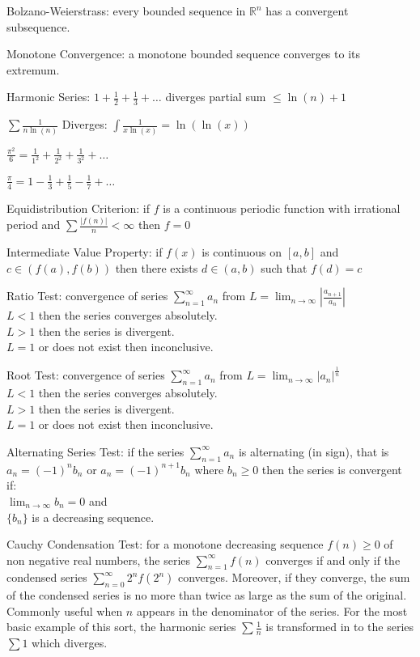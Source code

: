 Bolzano-Weierstrass: every bounded sequence in $\mathbb{R}^n$ has a convergent subsequence.

Monotone Convergence: a monotone bounded sequence converges to its extremum.

Harmonic Series: $1+\frac{1}{2}+\frac{1}{3}+\dots$ diverges partial sum $\le \ln(n)+1$

$\sum \frac{1}{n\ln(n)}$ Diverges: $\int \frac{1}{x\ln(x)} = \ln(\ln(x))$

$\frac{\pi^2}{6} = \frac{1}{1^2} + \frac{1}{2^2} + \frac{1}{3^2} + \dots$

$\frac{\pi}{4}=1-\frac{1}{3} +\frac{1}{5}-\frac{1}{7}+\dots$

Equidistribution Criterion: if $f$ is a continuous periodic function with irrational period and $\sum \frac{|f(n)|}{n} < \infty$ then $f=0$

Intermediate Value Property: if $f(x)$ is continuous on $[a,b]$ and $c \in (f(a),f(b))$ then there exists $d \in (a,b)$ such that $f(d)=c$

Ratio Test: convergence of series $\sum_{n=1}^{\infty} a_n$ from $L = \lim_{n \to \infty} \left|\frac{a_{n+1}}{a_n} \right|$ \\
$L<1$ then the series converges absolutely. \\
$L>1$ then the series is divergent. \\
$L=1$ or does not exist then inconclusive.

Root Test: convergence of series $\sum_{n=1}^{\infty} a_n$ from $L = \lim_{n \to \infty} |a_n|^{\frac{1}{n}}$ \\
$L<1$ then the series converges absolutely. \\
$L>1$ then the series is divergent. \\
$L=1$ or does not exist then inconclusive.

Alternating Series Test: if the series $\sum_{n=1}^{\infty} a_n$ is alternating (in sign), that is $a_n=(-1)^n b_n$ or $a_n=(-1)^{n+1} b_n$ where $b_n \ge 0$ then the series is convergent if: \\
$\lim_{n \to \infty} b_n = 0$ and \\
$\{b_n \}$ is a decreasing sequence.

Cauchy Condensation Test: for a monotone decreasing sequence $f(n) \ge 0$ of non negative real numbers, the series $\sum_{n=1}^{\infty} f(n)$ converges if and only if the condensed series $\sum_{n=0}^{\infty} 2^nf(2^n)$ converges. Moreover, if they converge, the sum of the condensed series is no more than twice as large as the sum of the original. Commonly useful when $n$ appears in the denominator of the series. For the most basic example of this sort, the harmonic series $\sum \frac{1}{n}$ is transformed in to the series $\sum 1$ which diverges.

